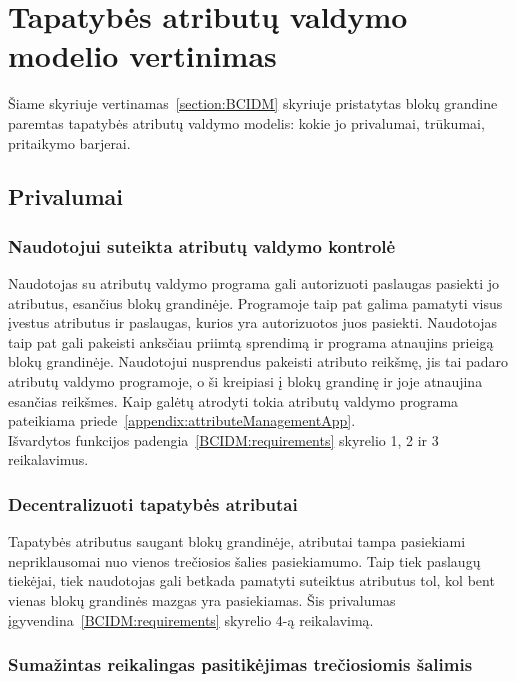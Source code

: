 \section{Tapatybės atributų valdymo modelio vertinimas}

Šiame skyriuje vertinamas\hypertarget{section:BCIDM}{~\ref{section:BCIDM}} skyriuje pristatytas blokų grandine paremtas tapatybės atributų
valdymo modelis: kokie jo privalumai, trūkumai, pritaikymo barjerai.

\subsection{Privalumai}

\subsubsection{Naudotojui suteikta atributų valdymo kontrolė}

Naudotojas su atributų valdymo programa gali autorizuoti paslaugas pasiekti jo atributus, esančius blokų grandinėje. Programoje
taip pat galima pamatyti visus įvestus atributus ir paslaugas, kurios yra autorizuotos juos pasiekti. Naudotojas taip pat
gali pakeisti anksčiau priimtą sprendimą ir programa atnaujins prieigą blokų grandinėje. Naudotojui nusprendus pakeisti
atributo reikšmę, jis tai padaro atributų valdymo programoje, o ši kreipiasi į blokų grandinę ir joje atnaujina esančias reikšmes. Kaip
galėtų atrodyti tokia atributų valdymo programa pateikiama priede\hypertarget{appendix:attributeManagementApp}{~\ref{appendix:attributeManagementApp}}.\\
Išvardytos funkcijos padengia\hypertarget{BCIDM:requirements}{~\ref{BCIDM:requirements}} skyrelio 1, 2 ir 3 reikalavimus.

\subsubsection{Decentralizuoti tapatybės atributai}

Tapatybės atributus saugant blokų grandinėje, atributai tampa pasiekiami nepriklausomai nuo vienos trečiosios šalies pasiekiamumo.
Taip tiek paslaugų tiekėjai, tiek naudotojas gali betkada pamatyti suteiktus atributus tol, kol bent vienas blokų grandinės mazgas
yra pasiekiamas.
Šis privalumas įgyvendina\hypertarget{BCIDM:requirements}{~\ref{BCIDM:requirements}} skyrelio 4-ą reikalavimą.

\subsubsection{Sumažintas reikalingas pasitikėjimas trečiosiomis šalimis}

